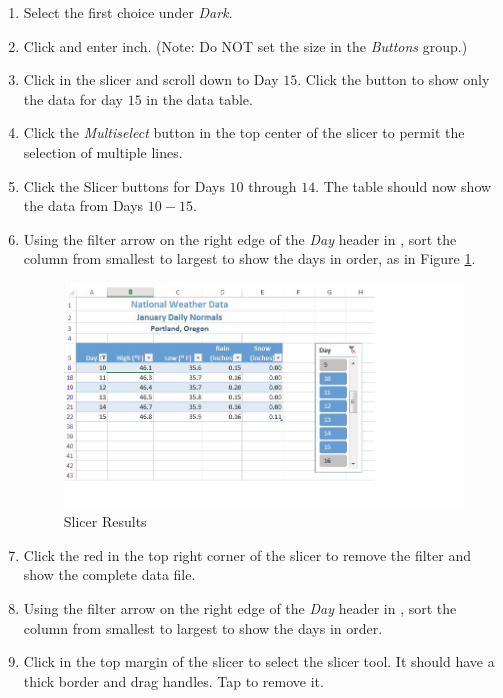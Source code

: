 \begin{enumbox}
	\begin{enumerate}
		\item Select the first choice under \textit{Dark}.
		\item Click  and enter  inch. (Note: Do NOT set the size in the \textit{Buttons} group.)
		\item Click in the slicer and scroll down to Day $ 15 $. Click the  button to show only the data for day $ 15 $ in the data table.
		\item Click the \textit{Multiselect} button in the top center of the slicer to permit the selection of multiple lines.
		\item Click the Slicer buttons for Days $ 10 $ through $ 14 $. The table should now show the data from Days $ 10-15 $.
		\item Using the filter arrow on the right edge of the \textit{Day} header in , sort the column from smallest to largest to show the days in order, as in Figure \ref{05:fig21}.

		\begin{figure}[H]
			\centering
			\includegraphics[width=\maxwidth{.95\linewidth}]{gfx/ch05_fig21}
			\caption{Slicer Results}
			\label{05:fig21}
		\end{figure}

		\item Click the red  in the top right corner of the slicer to remove the filter and show the complete data file.
		\item Using the filter arrow on the right edge of the \textit{Day} header in , sort the column from smallest to largest to show the days in order.
		\item Click in the top margin of the slicer to select the slicer tool. It should have a thick border and drag handles. Tap  to remove it.
	\end{enumerate}
\end{enumbox}

